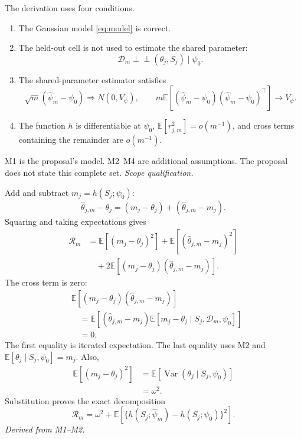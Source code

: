 \documentclass[11pt]{article}
\newcommand{\E}{\mathbb E}
\newcommand{\Var}{\operatorname{Var}}
\newcommand{\indep}{\mathrel{\perp\!\!\!\perp}}
\begin{document}
The derivation uses four conditions.
\begin{enumerate}[label=\textup{M\arabic*},leftmargin=2.5em]
 \item The Gaussian model \eqref{eq:model} is correct.
 \item The held-out cell is not used to estimate the shared parameter:
 \begin{equation}
  \mathcal D_m\indep(\theta_j,S_j)\mid\psi_0.
  \label{eq:holdout}
 \end{equation}
 \item The shared-parameter estimator satisfies
 \begin{equation}
  \sqrt m(\widehat\psi_m-\psi_0)\Rightarrow N(0,V_\psi),
  \qquad
  m\E[(\widehat\psi_m-\psi_0)(\widehat\psi_m-\psi_0)^\top]
  \longrightarrow V_\psi.
  \label{eq:parameter-rate}
 \end{equation}
 \item The function \(h\) is differentiable at \(\psi_0\),
 \(\E[r_{j,m}^2]=o(m^{-1})\), and cross terms containing the remainder are
 \(o(m^{-1})\).
\end{enumerate}
M1 is the proposal's model. M2--M4 are additional assumptions. The proposal
does not state this complete set. \emph{Scope qualification.}

Add and subtract \(m_j=h(S_j;\psi_0)\):
\begin{equation}
 \widehat\theta_{j,m}-\theta_j
 =(m_j-\theta_j)+(\widehat\theta_{j,m}-m_j).
 \label{eq:error-split}
\end{equation}
Squaring and taking expectations gives
\begin{align}
 \mathcal R_m
 &=\E[(m_j-\theta_j)^2]
   +\E[(\widehat\theta_{j,m}-m_j)^2] \\
 &\quad+2\E[(m_j-\theta_j)(\widehat\theta_{j,m}-m_j)].
 \label{eq:three-terms}
\end{align}
The cross term is zero:
\begin{align}
 &\E[(m_j-\theta_j)(\widehat\theta_{j,m}-m_j)] \\
 &\quad=\E\!\left[
  (\widehat\theta_{j,m}-m_j)
  \E[m_j-\theta_j\mid S_j,\mathcal D_m,\psi_0]
 \right] \\
 &\quad=0.
 \label{eq:cross-zero}
\end{align}
The first equality is iterated expectation. The last equality uses M2 and
\(\E[\theta_j\mid S_j,\psi_0]=m_j\). Also,
\begin{align}
 \E[(m_j-\theta_j)^2]
 &=\E[\Var(\theta_j\mid S_j,\psi_0)] \\
 &=\omega^2.
 \label{eq:omega-term}
\end{align}
Substitution proves the exact decomposition
\begin{equation}
 \mathcal R_m
 =\omega^2+
 \E[\{h(S_j;\widehat\psi_m)-h(S_j;\psi_0)\}^2].
 \label{eq:exact-mse}
\end{equation}
\emph{Derived from M1--M2.}
\end{document}
